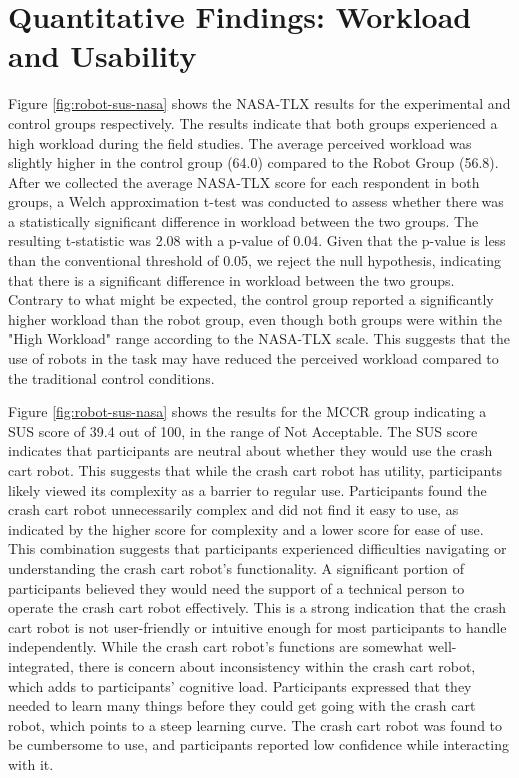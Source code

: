 \section{Quantitative Findings: Workload and Usability}
 \label{sec:quan_results}

Figure \ref{fig:robot-sus-nasa} shows the NASA-TLX results for the experimental and control groups respectively. 
The results indicate that both groups experienced a high workload during the field studies. 
The average perceived workload was slightly higher in the control group (64.0) compared to the Robot Group (56.8). 
After we collected the average NASA-TLX score for each respondent in both groups, a Welch approximation t-test was conducted to assess whether there was a statistically significant difference in workload between the two groups. 
The resulting t-statistic was 2.08 with a p-value of 0.04. 
Given that the p-value is less than the conventional threshold of 0.05, we reject the null hypothesis, indicating that there is a significant difference in workload between the two groups. 
Contrary to what might be expected, the control group reported a significantly higher workload than the robot group, even though both groups were within the "High Workload" range according to the NASA-TLX scale. 
This suggests that the use of robots in the task may have reduced the perceived workload compared to the traditional control conditions. 

Figure \ref{fig:robot-sus-nasa} shows the results for the MCCR group indicating a SUS score of 39.4 out of 100, in the range of Not Acceptable.
The SUS score indicates that participants are neutral about whether they would use the crash cart robot. 
This suggests that while the crash cart robot has utility, participants likely viewed its complexity as a barrier to regular use.
Participants found the crash cart robot unnecessarily complex and did not find it easy to use, as indicated by the higher score for complexity and a lower score for ease of use. 
This combination suggests that participants experienced difficulties navigating or understanding the crash cart robot’s functionality.
A significant portion of participants believed they would need the support of a technical person to operate the crash cart robot effectively. This is a strong indication that the crash cart robot is not user-friendly or intuitive enough for most participants to handle independently.
While the crash cart robot’s functions are somewhat well-integrated, there is concern about inconsistency within the crash cart robot, which adds to participants’ cognitive load.
Participants expressed that they needed to learn many things before they could get going with the crash cart robot, which points to a steep learning curve. 
The crash cart robot was found to be cumbersome to use, and participants reported low confidence while interacting with it.


